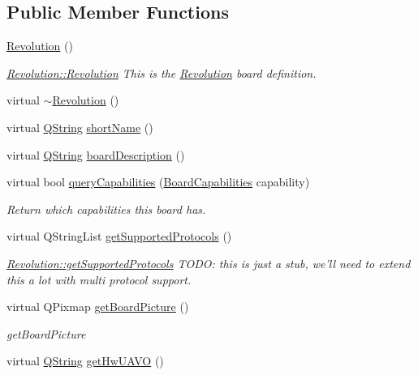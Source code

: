 \subsection*{\-Public \-Member \-Functions}
\begin{DoxyCompactItemize}
\item 
\hyperlink{group___boards___open_pilot_plugin_gad4ecc2008e08f7c54b4fe92215c77bbb}{\-Revolution} ()
\begin{DoxyCompactList}\small\item\em \hyperlink{group___boards___open_pilot_plugin_gad4ecc2008e08f7c54b4fe92215c77bbb}{\-Revolution\-::\-Revolution} \-This is the \hyperlink{class_revolution}{\-Revolution} board definition. \end{DoxyCompactList}\item 
virtual \hyperlink{group___boards___open_pilot_plugin_ga231a5a6f79ce02a7e05009982fb65d15}{$\sim$\-Revolution} ()
\item 
virtual \hyperlink{group___u_a_v_objects_plugin_gab9d252f49c333c94a72f97ce3105a32d}{\-Q\-String} \hyperlink{group___boards___open_pilot_plugin_gad4cc3e213b15f56ace6281fe55d94f32}{short\-Name} ()
\item 
virtual \hyperlink{group___u_a_v_objects_plugin_gab9d252f49c333c94a72f97ce3105a32d}{\-Q\-String} \hyperlink{group___boards___open_pilot_plugin_ga8f2a18257adeeb2cd190e4150cf5cc01}{board\-Description} ()
\item 
virtual bool \hyperlink{group___boards___open_pilot_plugin_gaef49c9e5a2cbbcbce7b6e7ed3867adaf}{query\-Capabilities} (\hyperlink{group___core_plugin_ga01b09218f2a13aaeee6db007ac6bd967}{\-Board\-Capabilities} capability)
\begin{DoxyCompactList}\small\item\em \-Return which capabilities this board has. \end{DoxyCompactList}\item 
virtual \-Q\-String\-List \hyperlink{group___boards___open_pilot_plugin_gaec390e1462c61b4e0d3b433f35159192}{get\-Supported\-Protocols} ()
\begin{DoxyCompactList}\small\item\em \hyperlink{group___boards___open_pilot_plugin_gaec390e1462c61b4e0d3b433f35159192}{\-Revolution\-::get\-Supported\-Protocols} \-T\-O\-D\-O\-: this is just a stub, we'll need to extend this a lot with multi protocol support. \end{DoxyCompactList}\item 
virtual \-Q\-Pixmap \hyperlink{group___boards___open_pilot_plugin_gae5372488eec83623b6aad34593708034}{get\-Board\-Picture} ()
\begin{DoxyCompactList}\small\item\em get\-Board\-Picture \end{DoxyCompactList}\item 
virtual \hyperlink{group___u_a_v_objects_plugin_gab9d252f49c333c94a72f97ce3105a32d}{\-Q\-String} \hyperlink{group___boards___open_pilot_plugin_ga0a6612a8dd453bde6ec037442d18c7c7}{get\-Hw\-U\-A\-V\-O} ()
\end{DoxyCompactItemize}


